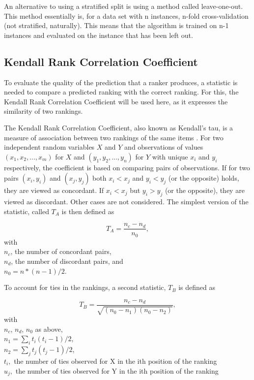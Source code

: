 An alternative to using a stratified split is using a method called leave-one-out. This method essentially is, for a data set with n instances, n-fold cross-validation (not stratified, naturally). This means that the algorithm is trained on n-1 instances and evaluated on the instance that has been left out.

\subsection{Kendall Rank Correlation Coefficient}
To evaluate the quality of the prediction that a ranker produces, a statistic is needed to compare a predicted ranking with the correct ranking. For this, the Kendall Rank Correlation Coefficient will be used here, as it expresses the similarity of two rankings.

The Kendall Rank Correlation Coefficient, also known as Kendall's tau, is a measure of association between two rankings of the same items \cite{kendall1938new}. For two independent random variables $X$ and $Y$ and observations of values $(x_1,x_2,...,x_m)$ for $X$ and $(y_1,y_2,...,y_n)$ for $Y$ with unique $x_i$ and $y_i$ respectively, the coefficient is based on comparing pairs of observations. If for two pairs $(x_i,y_i)$ and $(x_j,y_j)$ both $x_i < x_j$ and $y_i < y_j$ (or the opposite) holds, they are viewed as concordant. If $x_i < x_j$ but $y_i > y_j$ (or the opposite), they are viewed as discordant. Other cases are not considered. The simplest version of the statistic, called $T_A$ is then defined as 

$$T_A = \frac{n_c - n_d}{n_0},$$
with \\
$n_c$, the number of concordant pairs, \\
$n_d$, the number of discordant pairs, and \\
$n_0 = n * (n - 1) / 2$.

To account for ties in the rankings, a second statistic, $T_B$ is defined as

$$T_B = \frac{n_c - n_d}{\sqrt{(n_0 - n_1 )(n_0 - n_2 )}},$$
with \\
$n_c$, $n_d$, $n_0$ as above, \\
$n_1=\sum_i{t_i(t_i-1)/2}$, \\
$n_2=\sum_j{t_j(t_j-1)/2}$, \\
$t_i,$ the number of ties observed for X in the ith position of the ranking \\
$u_j,$ the number of ties observed for Y in the ith position of the ranking 

